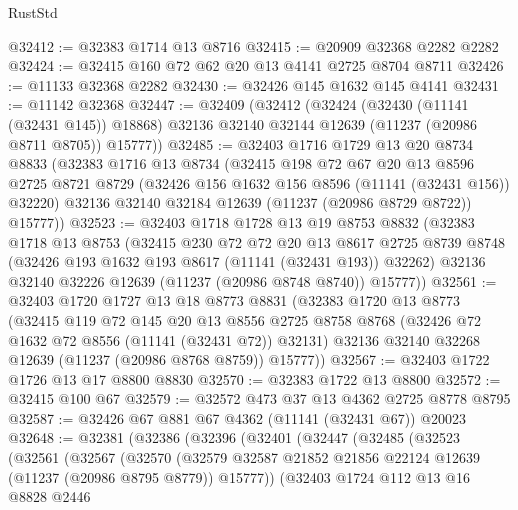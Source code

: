 \begin{lexlean}{RustStd}
\begin{coremodule}
@32412 := @32383 @1714 @13 @8716
@32415 := @20909 @32368 @2282 @2282
@32424 := @32415 @160 @72 @62 @20 @13 @4141 @2725 @8704 @8711
@32426 := @11133 @32368 @2282
@32430 := @32426 @145 @1632 @145 @4141
@32431 := @11142 @32368
@32447 := @32409
    (@32412
      (@32424
        (@32430 (@11141 (@32431 @145)) @18868)
        @32136
        @32140
        @32144
        @12639
        (@11237 (@20986 @8711 @8705))
        @15777))
@32485 := @32403
    @1716
    @1729
    @13
    @20
    @8734
    @8833
    (@32383
      @1716
      @13
      @8734
      (@32415
        @198
        @72
        @67
        @20
        @13
        @8596
        @2725
        @8721
        @8729
        (@32426 @156 @1632 @156 @8596 (@11141 (@32431 @156)) @32220)
        @32136
        @32140
        @32184
        @12639
        (@11237 (@20986 @8729 @8722))
        @15777))
@32523 := @32403
    @1718
    @1728
    @13
    @19
    @8753
    @8832
    (@32383
      @1718
      @13
      @8753
      (@32415
        @230
        @72
        @72
        @20
        @13
        @8617
        @2725
        @8739
        @8748
        (@32426 @193 @1632 @193 @8617 (@11141 (@32431 @193)) @32262)
        @32136
        @32140
        @32226
        @12639
        (@11237 (@20986 @8748 @8740))
        @15777))
@32561 := @32403
    @1720
    @1727
    @13
    @18
    @8773
    @8831
    (@32383
      @1720
      @13
      @8773
      (@32415
        @119
        @72
        @145
        @20
        @13
        @8556
        @2725
        @8758
        @8768
        (@32426 @72 @1632 @72 @8556 (@11141 (@32431 @72)) @32131)
        @32136
        @32140
        @32268
        @12639
        (@11237 (@20986 @8768 @8759))
        @15777))
@32567 := @32403 @1722 @1726 @13 @17 @8800 @8830
@32570 := @32383 @1722 @13 @8800
@32572 := @32415 @100 @67
@32579 := @32572 @473 @37 @13 @4362 @2725 @8778 @8795
@32587 := @32426 @67 @881 @67 @4362 (@11141 (@32431 @67)) @20023
@32648 := @32381
    (@32386
      (@32396
        (@32401
          (@32447
            (@32485
              (@32523
                (@32561
                  (@32567
                    (@32570
                      (@32579
                        @32587
                        @21852
                        @21856
                        @22124
                        @12639
                        (@11237 (@20986 @8795 @8779))
                        @15777))
                    (@32403
                      @1724
                      @112
                      @13
                      @16
                      @8828
                      @2446

\end{coremodule}
\end{lexlean}
